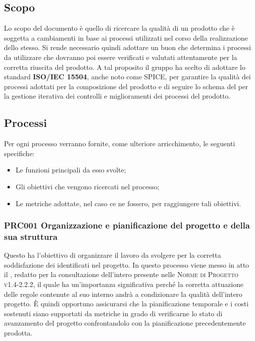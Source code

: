 \documentclass[../piano-di-qualifica.tex]{subfiles}
\begin{document}
\subsection{Scopo}%
\label{sub:scopo}
Lo scopo del documento è quello di ricercare la qualità di un prodotto che è soggetta a cambiamenti in base ai processi utilizzati nel corso della realizzazione dello stesso.
Si rende necessario quindi adottare un buon  che determina i processi da utilizzare che dovranno poi essere verificati e valutati attentamente per la corretta riuscita del prodotto.
A tal proposito il gruppo ha scelto di adottare lo standard \textbf{ISO/IEC 15504}, anche noto come SPICE, per garantire la qualità dei processi adottati per la composizione del prodotto e di seguire lo schema del  per la gestione iterativa dei controlli e miglioramenti dei processi del prodotto.

\subsection{Processi}%
\label{sub:processi}
Per ogni processo verranno fornite, come ulteriore arricchimento, le seguenti specifiche:
\begin{itemize}
    \item Le funzioni principali da esso svolte;
    \item Gli obiettivi che vengono ricercati nel processo;
    \item Le metriche adottate, nel caso ce ne fossero, per raggiungere tali obiettivi.
\end{itemize}

\subsubsection{PRC001 Organizzazione e pianificazione del progetto e della sua struttura}%
\label{sub:organizzazione_e_pianificazione_del_progetto_e_della_sua_struttura}
Questo  ha l'obiettivo di organizzare il lavoro da svolgere per la corretta soddisfazione dei  identificati nel progetto.
In questo processo viene messo in atto il , redatto per la consultazione dell'intero  presente nelle \textsc{Norme di Progetto v1.4-2.2.2}, il quale ha un'importanza significativa perché la corretta attuazione delle regole contenute al suo interno andrà a condizionare la qualità dell'intero progetto.
È quindi opportuno assicurarsi che la pianificazione temporale e i costi sostenuti siano supportati da metriche in grado di verificarne lo stato di avanzamento del progetto confrontandolo con la pianificazione precedentemente prodotta.
\end{document}
